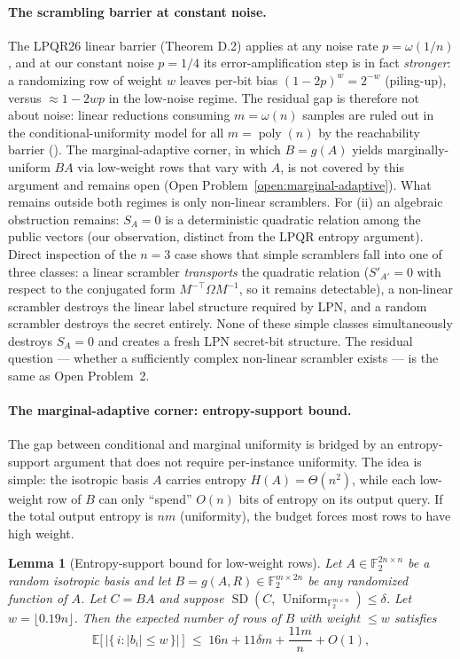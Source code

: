 \documentclass[11pt,a4paper]{article}
\theoremstyle{plain}
\newtheorem{lemma}[theorem]{Lemma}
\theoremstyle{definition}
\newcommand{\F}{\mathbb{F}}
\newcommand{\E}{\mathbb{E}}
\begin{document}
\paragraph{The scrambling barrier at constant noise.} The LPQR26 linear barrier (Theorem D.2) applies at any noise rate $p=\omega(1/n)$, and at our constant noise $p=1/4$ its error-amplification step is in fact \emph{stronger}: a randomizing row of weight $w$ leaves per-bit bias $(1-2p)^w = 2^{-w}$ (piling-up), versus $\approx 1-2wp$ in the low-noise regime. The residual gap is therefore not about noise: linear reductions consuming $m=\omega(n)$ samples are ruled out in the conditional-uniformity model for all $m=\operatorname{poly}(n)$ by the reachability barrier ().  The marginal-adaptive corner, in which $B=g(A)$ yields marginally-uniform $BA$ via low-weight rows that vary with $A$, is not covered by this argument and remains open (Open Problem~\ref{open:marginal-adaptive}).  What remains outside both regimes is only non-linear scramblers. For (ii) an algebraic obstruction remains: $S_A=0$ is a deterministic quadratic relation among the public vectors (our observation, distinct from the LPQR entropy argument). Direct inspection of the $n=3$ case shows that simple scramblers fall into one of three classes: a linear scrambler \emph{transports} the quadratic relation ($S'_{A'}=0$ with respect to the conjugated form $M^{-\top}\Omega M^{-1}$, so it remains detectable), a non-linear scrambler destroys the linear label structure required by LPN, and a random scrambler destroys the secret entirely. None of these simple classes simultaneously destroys $S_A=0$ and creates a fresh LPN secret-bit structure. The residual question --- whether a sufficiently complex non-linear scrambler exists --- is the same as Open Problem~2.

\paragraph{The marginal-adaptive corner: entropy-support bound.}
The gap between conditional and marginal uniformity is bridged by an entropy-support argument that does not require per-instance uniformity.  The idea is simple: the isotropic basis $A$ carries entropy $H(A)=\Theta(n^{2})$, while each low-weight row of $B$ can only ``spend'' $O(n)$ bits of entropy on its output query.  If the total output entropy is $nm$ (uniformity), the budget forces most rows to have high weight.

\begin{lemma}[Entropy-support bound for low-weight rows]
\label{lem:m1}
Let $A\in\F_2^{2n\times n}$ be a random isotropic basis and let $B=g(A,R)\in\F_2^{m\times 2n}$ be any randomized function of $A$.  Let $C=BA$ and suppose $\operatorname{SD}(C,\,\operatorname{Uniform}_{\F_2^{m\times n}})\le\delta$.  Let $w=\lfloor 0.19n\rfloor$.  Then the expected number of rows of $B$ with weight $\le w$ satisfies
\[
\E\bigl[\,\bigl|\{\,i:|b_i|\le w\,\}\bigr|\,\bigr]
\;\le\;
16n+11\delta m+\frac{11m}{n}+O(1),
\]
\end{lemma}
\end{document}

